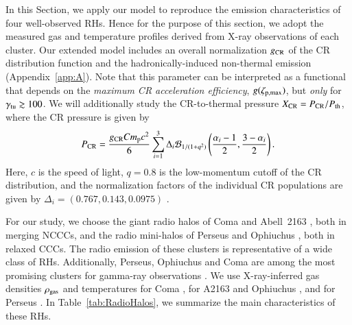 \documentclass[useAMS,usenatbib]{mn2e}
\begin{document}
In this Section, we apply our model to reproduce the emission characteristics of
four well-observed RHs. Hence for the purpose of this section, we adopt the
measured gas and temperature profiles derived from X-ray observations of each cluster.  
Our extended model includes an overall normalization $g_{{\mathrm{CR}}}$ of the CR
distribution function and the hadronically-induced non-thermal emission 
(Appendix~\ref{app:A}). Note that
this parameter can be interpreted as a functional that depends on the
\emph{maximum CR acceleration efficiency}, $g(\zeta_{{\mathrm{p,max}}})$,
\citep{2010MNRAS.409..449P} but \emph{only} for
$\gamma_{{\mathrm{tu}}}\gtrsim100$. We will additionally study the CR-to-thermal
pressure $X_{{\mathrm{CR}}}=P_{{\mathrm{CR}}}/P_{{\mathrm{th}}}$, where the CR pressure is
given by
\begin{equation}
  \label{eq:PCR}
  P_{{\mathrm{CR}}}=\frac{g_{{\mathrm{CR}}} C m_{{\mathrm{p}}} c^{2}}{6}
  \sum_{i=1}^{3} \Delta_{i} \mathcal{B}_{1/(1+q^2)} \left(
    \frac{\alpha_{i}-1}{2},\frac{3-\alpha_{i}}{2} \right).
\end{equation}
Here, $c$ is the speed of light, $q=0.8$ is the low-momentum cutoff of the CR
distribution, and the normalization factors of the individual CR populations are
given by $\Delta_{i} = (0.767, 0.143, 0.0975)$ \citep[][see also
Appendix~\ref{app:A}]{2010MNRAS.409..449P}.

For our study, we choose the giant radio halos of Coma
\citep{1997A&A...321...55D} and Abell~2163 \citep{2001A&A...373..106F,
  2009A&A...499..679M}, both in merging NCCCs, and the radio mini-halos of
Perseus \citep{1990MNRAS.246..477P} and Ophiuchus \citep{2009A&A...499..371G,
  2009A&A...499..679M}, both in relaxed CCCs. The radio emission of these
clusters is representative of a wide class of RHs.  Additionally, Perseus,
Ophiuchus and Coma are among the most promising clusters for gamma-ray
observations \citep{2010MNRAS.409..449P,2011arXiv1105.3240P}. 
We use X-ray-inferred gas densities $\rho_{{\mathrm{gas}}}$ and temperatures 
for Coma \citep{1992A&A...259L..31B}, for A2163 and Ophiuchus 
\citep{2002ApJ...567..716R}, and for Perseus \citep{2003ApJ...590..225C}. 
In Table~\ref{tab:RadioHalos}, we summarize the main characteristics of these RHs.
\end{document}
